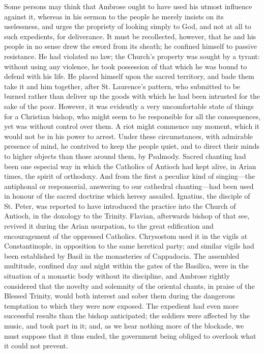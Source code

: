 Some persons may think that Ambrose ought to have used his
utmost influence against it, whereas in his sermon to the people he
merely insists on its uselessness, and urges the propriety of looking
simply to God, and not at all to such expedients, for deliverance. It
must be recollected, however, that he and his people in no sense drew
the sword from its sheath; he confined himself to passive resistance.
He had violated no law; the Church's property was sought by a tyrant:
without using any violence, he took possession of that which he was
bound to defend with his life. He placed himself upon the sacred
territory, and bade them take it and him together, after St. Laurence's
pattern, who submitted to be burned rather than deliver up the goods
with which he had been intrusted for the sake of the poor. However, it
was evidently a very uncomfortable state of things for a Christian
bishop, who might seem to be responsible for all the consequences, yet
was without control over them. A riot might commence any moment, which
it would not be in his power to arrest. Under these circumstances,
with admirable presence of mind, he contrived to keep the people
quiet, and to direct their minds to higher objects than those around
them, by Psalmody. Sacred chanting had been one especial way in which
the Catholics of Antioch had kept alive, in Arian times, the spirit of
orthodoxy. And from the first a peculiar kind of singing—the
antiphonal or responsorial, answering to our cathedral chanting—had
been used in honour of the sacred doctrine which heresy assailed.
Ignatius, the disciple of St. Peter, was reported to have introduced
the practice into the Church of Antioch, in the doxology to the
Trinity. Flavian, afterwards bishop of that see, revived it during the
Arian usurpation, to the great edification and encouragement of the
oppressed Catholics. Chrysostom used it in the vigils at
Constantinople, in opposition to the same heretical party; and similar
vigils had been established by Basil in the monasteries of Cappadocia.
The assembled multitude, confined day and night within the gates of
the Basilica, were in the situation of a monastic body without its
discipline, and Ambrose rightly considered that the novelty and
solemnity of the oriental chants, in praise of the Blessed Trinity,
would both interest and sober them during the dangerous temptation to
which they were now exposed. The expedient had even more successful
results than the bishop anticipated; the soldiers were affected by the
music, and took part in it; and, as we hear nothing more of the
blockade, we must suppose that it thus ended, the government being
obliged to overlook what it could not prevent.

